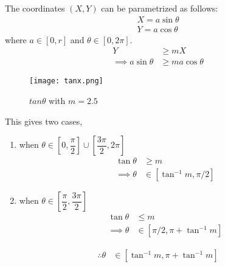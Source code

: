 \documentclass[journal,12pt,twocolumn]{IEEEtran}
\theoremstyle{remark}
\numberwithin{equation}{subsection}
\begin{document}
The coordinates $(X,Y)$ can be parametrized as follows:
\begin{align}
    X = a\sin\theta\\
    Y = a\cos\theta
\end{align} 
where $a \in [0,r]$ and $\theta \in [0, 2\pi]$. 
\begin{align}
    Y &\geq mX\\
    \implies a\sin\theta &\geq ma\cos\theta
\end{align}

\begin{figure}[h]
    \centering
    \texttt{[image: tanx.png]}
    \caption{$tan\theta$ with $m=2.5$}
    \label{fig:my_label}
\end{figure}

This gives two cases,
\begin{enumerate}
    \item when $\theta\in \left[0,\dfrac{\pi}{2}\right]\cup\left[\dfrac{3\pi}{2},2\pi\right]$
    \begin{align}
        \tan\theta&\geq m\\
        \implies \theta &\in [\tan^{-1}m, \pi/2]
    \end{align}
    \item when $\theta \in \left[\dfrac{\pi}{2}, \dfrac{3\pi}{2}\right]$
    \begin{align}
        \tan\theta&\leq m\\
        \implies \theta &\in [\pi/2, \pi+\tan^{-1}m]
    \end{align}
\end{enumerate}
\begin{align}
    \therefore \theta &\in [\tan^{-1} m, \pi+\tan^{-1} m]
\end{align}
\end{document}

